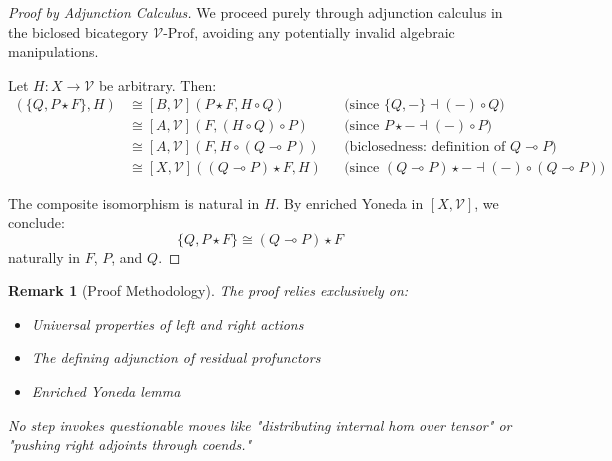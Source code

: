 \documentclass[11pt]{article}
\numberwithin{equation}{section}
\theoremstyle{upright}
\newtheorem{remark}{Remark}
\newcommand{\V}{\mathcal{V}}
\newcommand{\Prof}{\mathrm{Prof}}
\begin{document}
\begin{proof}[Proof by Adjunction Calculus]
We proceed purely through adjunction calculus in the biclosed bicategory $\V\text{-}\Prof$, avoiding any potentially invalid algebraic manipulations.

Let $H: X \to \V$ be arbitrary. Then:
\begin{align}
[X,\V](\{Q, P \star F\}, H) 
&\cong [B,\V](P \star F, H \circ Q) && \text{(since $\{Q,-\} \dashv (-) \circ Q$)} \\
&\cong [A,\V](F, (H \circ Q) \circ P) && \text{(since $P \star - \dashv (-) \circ P$)} \\
&\cong [A,\V](F, H \circ (Q \multimap P)) && \text{(biclosedness: definition of $Q \multimap P$)} \\
&\cong [X,\V]((Q \multimap P) \star F, H) && \text{(since $(Q \multimap P) \star - \dashv (-) \circ (Q \multimap P)$)}
\end{align}

The composite isomorphism is natural in $H$. By enriched Yoneda in $[X,\V]$, we conclude:
\begin{equation}
\{Q, P \star F\} \cong (Q \multimap P) \star F
\end{equation}
naturally in $F$, $P$, and $Q$.
\end{proof}

\begin{remark}[Proof Methodology]
The proof relies exclusively on:
\begin{itemize}[itemsep=0.5ex]
\item Universal properties of left and right actions
\item The defining adjunction of residual profunctors  
\item Enriched Yoneda lemma
\end{itemize}
No step invokes questionable moves like "distributing internal hom over tensor" or "pushing right adjoints through coends."
\end{remark}

\FloatBarrier   %
\end{document}

